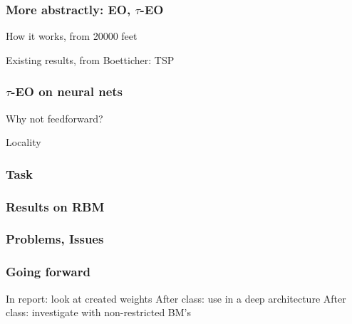 \documentclass{beamer}
\begin{document}
\begin{frame}
  \frametitle{More abstractly: EO, $\tau$-EO}
  How it works, from 20000 feet

  Existing results, from Boetticher: TSP
\end{frame}

\begin{frame}
  \frametitle{$\tau$-EO on neural nets}
  Why not feedforward?

  Locality

\end{frame}


\begin{frame}
  \frametitle{Task}
\end{frame}

\begin{frame}
  \frametitle{Results on RBM}
\end{frame}

\begin{frame}
  \frametitle{Problems, Issues}

\end{frame}

\begin{frame}
  \frametitle{Going forward}
  In report: look at created weights
  After class: use in a deep architecture
  After class: investigate with non-restricted BM's
\end{frame}
\end{document}
